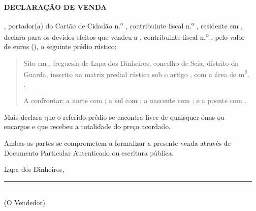 \documentclass[a4paper,12pt]{article}
\begin{document}
\justifying

\begin{center}
{\Large\bfseries DECLARA\c{C}\~AO DE VENDA}\\[1.5cm]
\end{center}

\noindent \vendedorNome, portador(a) do Cart\~ao de Cidad\~ao n.\textsuperscript{o} \vendedorCC, contribuinte fiscal n.\textsuperscript{o} \vendedorNIF, residente em \vendedorMorada, declara para os devidos efeitos que vendeu a \compradorNome, contribuinte fiscal n.\textsuperscript{o} \compradorNIF, pelo valor de \precoValor{} euros (\precoExtenso), o seguinte pr\'edio r\'ustico:

\vspace{0.5cm}

\begin{quote}
\noindent Sito em \predioDenominacao, freguesia de Lapa dos Dinheiros, concelho de Seia, distrito da Guarda, inscrito na matriz predial r\'ustica sob o artigo \predioArtigoMatricial\predioArtigoProveniencia, com a \'area de \predioArea{} m\textsuperscript{2}. \predioDescricao.

\vspace{0.3cm}

\noindent A confrontar: a norte com \confNorte; a sul com \confSul; a nascente com \confNascente; e a poente com \confPoente.
\end{quote}

\vspace{0.5cm}

\predioNota

\noindent Mais declara que o referido pr\'edio se encontra livre de quaisquer \'onus ou encargos e que recebeu a totalidade do pre\c{c}o acordado.

\vspace{0.3cm}

\noindent Ambas as partes se comprometem a formalizar a presente venda atrav\'es de Documento Particular Autenticado ou escritura p\'ublica.

\vspace{0.8cm}

\noindent Lapa dos Dinheiros, \dataDocumento

\vspace{1.5cm}

\begin{center}
\rule{8cm}{0.4pt}\\[0.2cm]
{\small (O Vendedor)}
\end{center}
\end{document}
